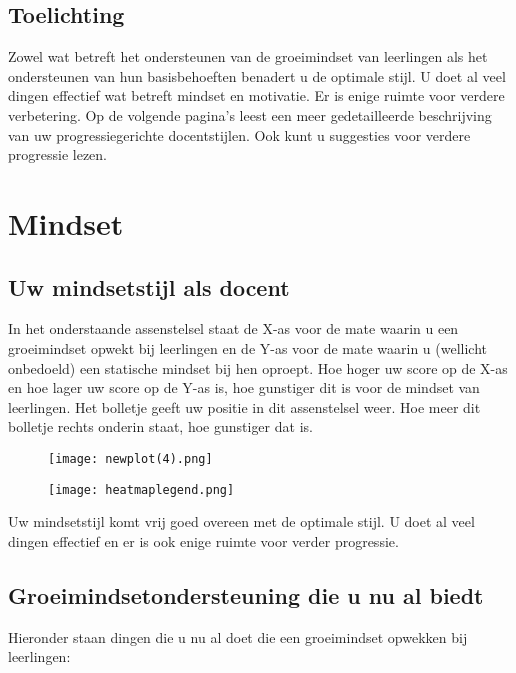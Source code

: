 \documentclass{article}
\begin{document}
\subsection{Toelichting} %
Zowel wat betreft het ondersteunen van de groeimindset van leerlingen als het ondersteunen van hun basisbehoeften benadert u de optimale stijl. U doet al veel dingen effectief wat betreft mindset en motivatie. Er is enige ruimte voor verdere verbetering. Op de volgende pagina’s leest een meer gedetailleerde beschrijving van uw progressiegerichte docentstijlen. Ook kunt u suggesties voor verdere progressie lezen. \newpage





\section{Mindset}
\subsection{Uw mindsetstijl als docent} %
In het onderstaande assenstelsel staat de X-as voor de mate waarin u een groeimindset opwekt bij leerlingen en de Y-as voor de mate waarin u (wellicht onbedoeld) een statische mindset bij hen oproept. Hoe hoger uw score op de X-as en hoe lager uw score op de Y-as is, hoe gunstiger dit is voor de mindset van leerlingen. Het bolletje geeft uw positie in dit assenstelsel weer. Hoe meer dit bolletje rechts onderin staat, hoe gunstiger dat is.

\begin{figure}[!h]
    \centering
    \begin{minipage}{0.9\textwidth}
        \centering
        \texttt{[image: newplot(4).png]}
    \end{minipage}%
    \begin{minipage}{0.3\textwidth}
        \flushleft
        \texttt{[image: heatmaplegend.png]}
    \end{minipage}
\end{figure}

Uw mindsetstijl komt vrij goed overeen met de optimale stijl. U doet al veel dingen effectief en er is ook enige ruimte voor verder progressie.

\newpage
\subsection{Groeimindsetondersteuning die u nu al biedt}
Hieronder staan dingen die u nu al doet die een groeimindset opwekken bij leerlingen:
\end{document}
